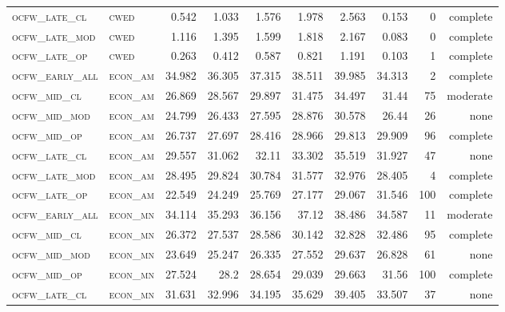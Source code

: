 \begin{landscape}
\begin{center}
\begin{footnotesize}
\begin{longtable}{llrrrrr|rrr}
\textsc{ocfw\_late\_cl  } & \textsc{cwed      }    & 0.542    & 1.033    & 1.576    & 1.978    & 2.563    & 0.153    & 0   & complete \\
\textsc{ocfw\_late\_mod } & \textsc{cwed      }    & 1.116    & 1.395    & 1.599    & 1.818    & 2.167    & 0.083    & 0   & complete \\
\textsc{ocfw\_late\_op  } & \textsc{cwed      }    & 0.263    & 0.412    & 0.587    & 0.821    & 1.191    & 0.103    & 1   & complete \\
\textsc{ocfw\_early\_all} & \textsc{econ\_am  }    & 34.982   & 36.305   & 37.315   & 38.511   & 39.985   & 34.313   & 2   & complete \\
\textsc{ocfw\_mid\_cl   } & \textsc{econ\_am  }    & 26.869   & 28.567   & 29.897   & 31.475   & 34.497   & 31.44    & 75  & moderate \\
\textsc{ocfw\_mid\_mod  } & \textsc{econ\_am  }    & 24.799   & 26.433   & 27.595   & 28.876   & 30.578   & 26.44    & 26  & none     \\
\textsc{ocfw\_mid\_op   } & \textsc{econ\_am  }    & 26.737   & 27.697   & 28.416   & 28.966   & 29.813   & 29.909   & 96  & complete \\
\textsc{ocfw\_late\_cl  } & \textsc{econ\_am  }    & 29.557   & 31.062   & 32.11    & 33.302   & 35.519   & 31.927   & 47  & none     \\
\textsc{ocfw\_late\_mod } & \textsc{econ\_am  }    & 28.495   & 29.824   & 30.784   & 31.577   & 32.976   & 28.405   & 4   & complete \\
\textsc{ocfw\_late\_op  } & \textsc{econ\_am  }    & 22.549   & 24.249   & 25.769   & 27.177   & 29.067   & 31.546   & 100 & complete \\
\textsc{ocfw\_early\_all} & \textsc{econ\_mn  }    & 34.114   & 35.293   & 36.156   & 37.12    & 38.486   & 34.587   & 11  & moderate \\
\textsc{ocfw\_mid\_cl   } & \textsc{econ\_mn  }    & 26.372   & 27.537   & 28.586   & 30.142   & 32.828   & 32.486   & 95  & complete \\
\textsc{ocfw\_mid\_mod  } & \textsc{econ\_mn  }    & 23.649   & 25.247   & 26.335   & 27.552   & 29.637   & 26.828   & 61  & none     \\
\textsc{ocfw\_mid\_op   } & \textsc{econ\_mn  }    & 27.524   & 28.2     & 28.654   & 29.039   & 29.663   & 31.56    & 100 & complete \\
\textsc{ocfw\_late\_cl  } & \textsc{econ\_mn  }    & 31.631   & 32.996   & 34.195   & 35.629   & 39.405   & 33.507   & 37  & none     \\

\end{longtable}
\end{footnotesize}
\end{center}
\end{landscape}

